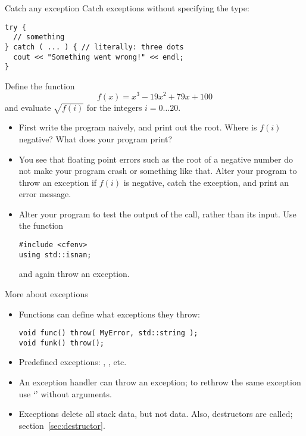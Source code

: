 \begin{block}{Catch any exception}
  \label{sl:exception-catchall}
  Catch exceptions without specifying the type:
\begin{verbatim}
try {
  // something
} catch ( ... ) { // literally: three dots
  cout << "Something went wrong!" << endl;
}
\end{verbatim}
\end{block}

\begin{exercise}
  Define the function \[ f(x)=x^3-19x^2+79x+100 \] and evaluate
  $\sqrt{f(i)}$ for the integers $i=0\ldots20$.
  \begin{itemize}
  \item First write the program naively, and print out the root. Where is
    $f(i)$ negative? What does your program print?
  \item You see that floating point errors such as the root of a negative number
    do not make your program crash or
    something like that. Alter your program to throw an exception if
    $f(i)$ is negative, catch the exception, and print an error
    message.
  \item Alter your program to test the output of the  call,
    rather than its input.
    Use the function 
\begin{verbatim}
#include <cfenv>
using std::isnan;  
\end{verbatim}
    and again throw an exception.
  \end{itemize}
\end{exercise}

\begin{block}{More about exceptions}
  \label{sl:exception-more}
  \begin{itemize}
  \item Functions can define what exceptions they throw: 
\begin{verbatim}
void func() throw( MyError, std::string );
void funk() throw();
\end{verbatim}
\item Predefined exceptions: ,
  , etc.
\item An exception handler can throw an exception; to rethrow the same
  exception use `' without arguments.
\item Exceptions delete all stack data, but not  data. Also,
  destructors are called; section~\ref{sec:destructor}.
  \end{itemize}
\end{block}
